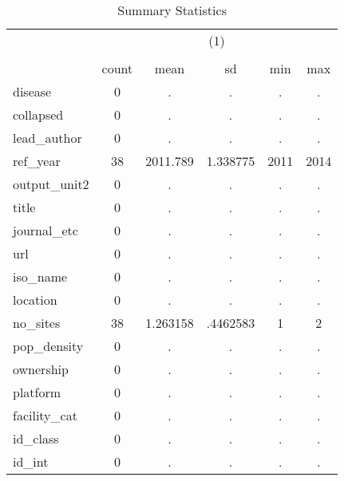 \begin{table}[htbp]\centering
\def\sym#1{\ifmmode^{#1}\else\(^{#1}\)\fi}
\caption{Summary Statistics}
\begin{tabular}{l*{1}{ccccc}}
\hline\hline
            &\multicolumn{5}{c}{(1)}                                         \\
            &\multicolumn{5}{c}{}                                            \\
            &       count&        mean&          sd&         min&         max\\
\hline
disease     &           0&           .&           .&           .&           .\\
collapsed   &           0&           .&           .&           .&           .\\
lead\_author &           0&           .&           .&           .&           .\\
ref\_year    &          38&    2011.789&    1.338775&        2011&        2014\\
output\_unit2&           0&           .&           .&           .&           .\\
title       &           0&           .&           .&           .&           .\\
journal\_etc &           0&           .&           .&           .&           .\\
url         &           0&           .&           .&           .&           .\\
iso\_name    &           0&           .&           .&           .&           .\\
location    &           0&           .&           .&           .&           .\\
no\_sites    &          38&    1.263158&    .4462583&           1&           2\\
pop\_density &           0&           .&           .&           .&           .\\
ownership   &           0&           .&           .&           .&           .\\
platform    &           0&           .&           .&           .&           .\\
facility\_cat&           0&           .&           .&           .&           .\\
id\_class    &           0&           .&           .&           .&           .\\
id\_int      &           0&           .&           .&           .&           .\\

\end{tabular}
\end{table}
